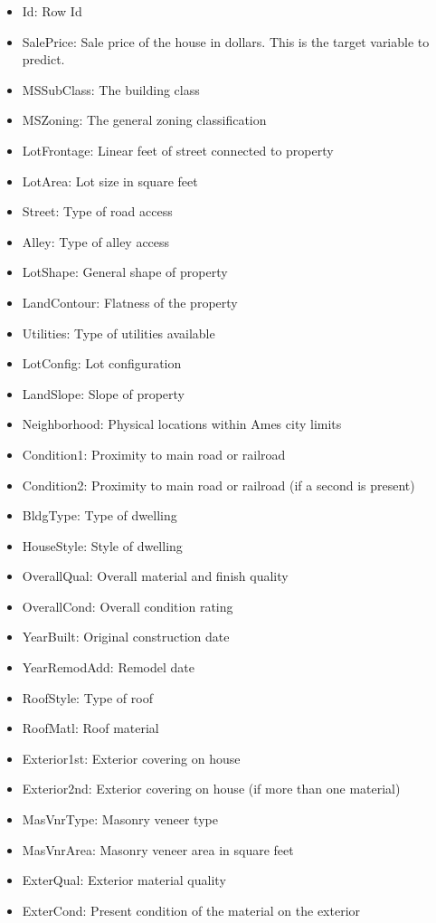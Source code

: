 \documentclass[sigconf]{acmart}
\begin{document}
	\begin{itemize}
		\item Id: Row Id
		\item SalePrice: Sale price of the house in dollars. This is the target variable to predict.
		\item MSSubClass: The building class
		\item MSZoning: The general zoning classification
		\item LotFrontage: Linear feet of street connected to property
		\item LotArea: Lot size in square feet
		\item Street: Type of road access
		\item Alley: Type of alley access
		\item LotShape: General shape of property
		\item LandContour: Flatness of the property
		\item Utilities: Type of utilities available
		\item LotConfig: Lot configuration
		\item LandSlope: Slope of property
		\item Neighborhood: Physical locations within Ames city limits
		\item Condition1: Proximity to main road or railroad
		\item Condition2: Proximity to main road or railroad (if a second is present)
		\item BldgType: Type of dwelling
		\item HouseStyle: Style of dwelling
		\item OverallQual: Overall material and finish quality
		\item OverallCond: Overall condition rating
		\item YearBuilt: Original construction date
		\item YearRemodAdd: Remodel date
		\item RoofStyle: Type of roof
		\item RoofMatl: Roof material
		\item Exterior1st: Exterior covering on house
		\item Exterior2nd: Exterior covering on house (if more than one material)
		\item MasVnrType: Masonry veneer type
		\item MasVnrArea: Masonry veneer area in square feet
		\item ExterQual: Exterior material quality
		\item ExterCond: Present condition of the material on the exterior

\end{itemize}
\end{document}

